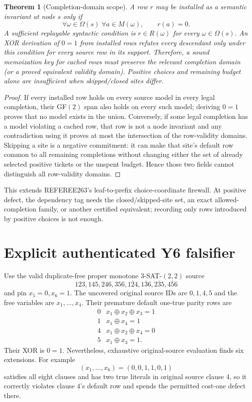\documentclass[11pt]{article}
\newtheorem{theorem}{Theorem}
\begin{document}
\begin{theorem}[Completion-domain scope]
A row $r$ may be installed as a semantic invariant at node $s$ only if
\[
  \forall\omega\in\Omega(s)\;\forall a\in M(\omega),\qquad r(a)=0.
\]
A sufficient replayable syntactic condition is $r\in R(\omega)$ for every $\omega\in\Omega(s)$.  An XOR derivation of $0=1$ from installed rows refutes every descendant only under this condition for every source row in its support.  Therefore, a sound memoization key for cached rows must preserve the relevant completion domain (or a proved equivalent validity domain).  Positive choices and remaining budget alone are insufficient when skipped/closed sites differ.
\end{theorem}
\begin{proof}
If every installed row holds on every source model in every legal completion, their GF$(2)$ span also holds on every such model; deriving $0=1$ proves that no model exists in the union.  Conversely, if some legal completion has a model violating a cached row, that row is not a node invariant and any contradiction using it proves at most the intersection of the row-validity domains.  Skipping a site is a negative commitment: it can make that site's default row common to all remaining completions without changing either the set of already selected positive tickets or the unspent budget.  Hence those two fields cannot distinguish all row-validity domains.
\end{proof}

This extends REFEREE263's leaf-to-prefix choice-coordinate firewall.  At positive defect, the dependency tag needs the closed/skipped-site set, an exact allowed-completion family, or another certified equivalent; recording only rows introduced by positive choices is not enough.

\section{Explicit authenticated Y6 falsifier}
Use the valid duplicate-free proper monotone 3-SAT-$(2,2)$ source
\[
123,145,246,356,\overline{124},\overline{136},\overline{235},\overline{456}
\]
and pin $x_5=0,x_6=1$.  The uncovered original source IDs are $0,1,4,5$ and the free variables are $x_1,\ldots,x_4$.  Their premature default one-true parity rows are
\[
\begin{array}{c|c}
0&x_1\oplus x_2\oplus x_3=1\\
1&x_1\oplus x_4=1\\
4&x_1\oplus x_2\oplus x_4=0\\
5&x_1\oplus x_3=1.
\end{array}
\]
Their XOR is $0=1$.  Nevertheless, exhaustive original-source evaluation finds six extensions.  For example
\[
  (x_1,\ldots,x_6)=(0,0,1,1,0,1)
\]
satisfies all eight clauses and has two true literals in original source clause $4$, so it correctly violates clause $4$'s default row and spends the permitted cost-one defect there.
\end{document}
